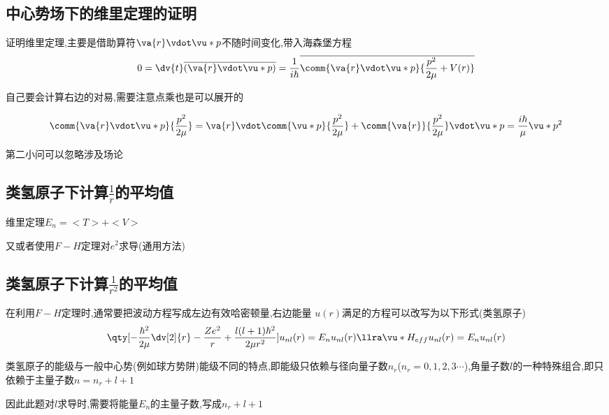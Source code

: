         \subsection{中心势场下的维里定理的证明}

            \begin{formal}
                证明维里定理,主要是借助算符$ \va{r} \vdot \vu*{p} $不随时间变化,带入海森堡方程
                $$ 0 = \dv{t} \overline{(\va{r} \vdot \vu*{p})} =  \frac{1}{i\hbar} \overline{\comm{\va{r} \vdot \vu*{p}}{\frac{p^{2}}{2\mu}+V(r)}} $$
            \end{formal}

            自己要会计算右边的对易,需要注意点乘也是可以展开的

            $$ 
            \comm{\va{r} \vdot \vu*{p} }{\frac{p^{2}}{2\mu}} = \va{r} \vdot \comm{\vu*{p}}{\frac{p^{2}}{2\mu}} + 
            \comm{\va{r}}{\frac{p^{2}}{2\mu}} \vdot \vu*{p} = \frac{i\hbar}{\mu}\vu*{p}^{2} 
            $$

            第二小问可以忽略涉及场论

        \subsection{类氢原子下计算\texorpdfstring{$\frac{1}{r}$}{}的平均值}
            维里定理$ E_{n} = <T> +  <V>  $

            又或者使用$F-H$定理对$e^{2}$求导(通用方法)

        \subsection{类氢原子下计算\texorpdfstring{$\frac{1}{r^{2}}$}{}的平均值}
            在利用$F-H$定理时,通常要把波动方程写成左边有效哈密顿量,右边能量
            $u(r)$满足的方程可以改写为以下形式(类氢原子)
            $$ 
            \qty[ -\frac{\hbar^{2}}{2\mu} \dv[2]{r} - \frac{Ze^{2}}{r} + 
            \frac{l(l+1)\hbar^{2}}{2\mu r^{2}} ] u_{nl}(r) = E_{n} u_{nl}(r)  \llra  \vu*{H}_{eff} u_{nl}(r) = E_{n} u_{nl}(r)
            $$

            \begin{formal}
                类氢原子的能级与一般中心势(例如球方势阱)能级不同的特点,即能级只依赖与径向量子数$n_{r}$($n_{r} = 0,1,2,3\cdots$),角量子数$l$的一种特殊组合,即只依赖于主量子数$n = n_{r} + l + 1$
            \end{formal}

            因此此题对$l$求导时,需要将能量$E_{n}$的主量子数,写成$n_{r}+l+1$


